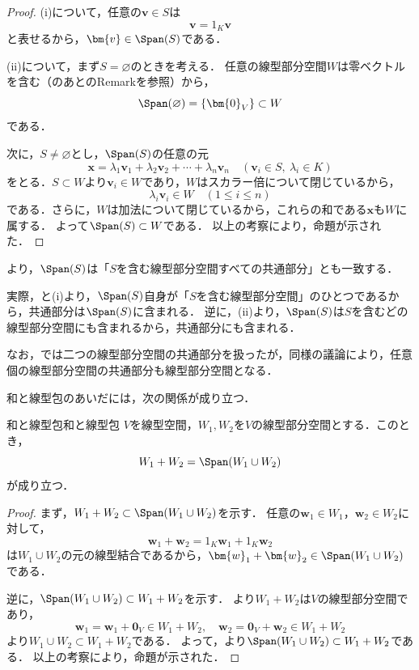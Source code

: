 \begin{leftbar}
\begin{proof}
  (i)について，任意の$\bm{v} \in S$は
  \[
    \bm{v} = 1_K \bm{v}
  \]
  と表せるから，$\bm{v} \in \Span(S)$である．

  (ii)について，まず$S = \varnothing$のときを考える．
  任意の線型部分空間$W$は零ベクトルを含む（のあとのRemarkを参照）から，
  \[
    \Span(\varnothing) = \{\bm{0}_V\} \subset W
  \]
  である．

  次に，$S \neq \varnothing$とし，$\Span(S)$の任意の元
  \[
    \bm{x} = \lambda_1 \bm{v}_1 + \lambda_2 \bm{v}_2 + \cdots + \lambda_n \bm{v}_n
    \quad (\bm{v}_i \in S,\ \lambda_i \in K)
  \]
  をとる．$S \subset W$より$\bm{v}_i \in W$であり，$W$はスカラー倍について閉じているから，
  \[
    \lambda_i \bm{v}_i \in W \quad (1 \le i \le n)
  \]
  である．さらに，$W$は加法について閉じているから，これらの和である$\bm{x}$も$W$に属する．
  よって$\Span(S) \subset W$である．
  以上の考察により，命題が示された．
\end{proof}
\end{leftbar}

\begin{remark}[線型包と共通部分]
より，$\Span(S)$は「$S$を含む線型部分空間すべての共通部分」とも一致する．

実際，と(i)より，$\Span(S)$自身が「$S$を含む線型部分空間」のひとつであるから，共通部分は$\Span(S)$に含まれる．
逆に，(ii)より，$\Span(S)$は$S$を含むどの線型部分空間にも含まれるから，共通部分にも含まれる．

なお，では二つの線型部分空間の共通部分を扱ったが，同様の議論により，任意個の線型部分空間の共通部分も線型部分空間となる．
\end{remark}

和と線型包のあいだには，次の関係が成り立つ．

\begin{prop}{和と線型包}{和と線型包}
  $V$を線型空間，$W_1, W_2$を$V$の線型部分空間とする．このとき，
  \[
    W_1 + W_2 = \Span(W_1 \cup W_2)
  \]
  が成り立つ．
\end{prop}

\begin{leftbar}
\begin{proof}
  まず，$W_1 + W_2 \subset \Span(W_1 \cup W_2)$を示す．
  任意の$\bm{w}_1 \in W_1$，$\bm{w}_2 \in W_2$に対して，
  \[
    \bm{w}_1 + \bm{w}_2 = 1_K \bm{w}_1 + 1_K \bm{w}_2
  \]
  は$W_1 \cup W_2$の元の線型結合であるから，$\bm{w}_1 + \bm{w}_2 \in \Span(W_1 \cup W_2)$である．

  逆に，$\Span(W_1 \cup W_2) \subset W_1 + W_2$を示す．
  より$W_1 + W_2$は$V$の線型部分空間であり，
  \[
    \bm{w}_1 = \bm{w}_1 + \bm{0}_V \in W_1 + W_2,
    \quad
    \bm{w}_2 = \bm{0}_V + \bm{w}_2 \in W_1 + W_2
  \]
  より$W_1 \cup W_2 \subset W_1 + W_2$である．
  よって，より$\Span(W_1 \cup W_2) \subset W_1 + W_2$である．
  以上の考察により，命題が示された．
\end{proof}
\end{leftbar}

